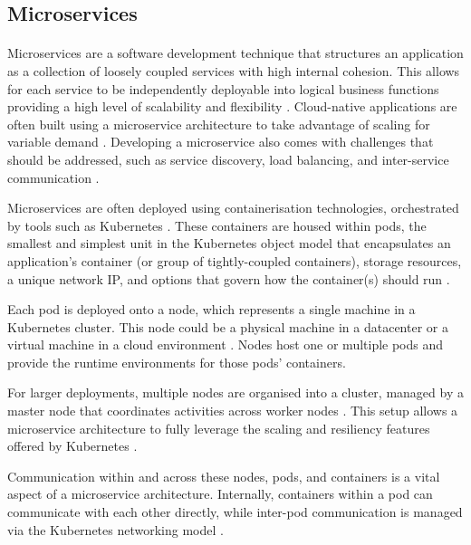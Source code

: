 \documentclass[12pt, conference, final, a4paper, onecolumn, compsoc]{IEEEtran}
\begin{document}
\subsection{Microservices} %
\paragraph{}

Microservices are a software development technique that structures an
application as a collection of loosely coupled services with high internal
cohesion. This allows for each service to be independently deployable into
logical business functions providing a high level of scalability and flexibility
\citep{microservice}. Cloud-native applications are often built using a
microservice architecture to take advantage of scaling for variable demand
\citep{microservice}. Developing a microservice also comes with
challenges that should be addressed, such as service discovery, load balancing,
and inter-service communication \citep{microservice}.

Microservices are often deployed using containerisation technologies,
orchestrated by tools such as Kubernetes \citep{kubernetes}. These containers
are housed within pods, the smallest and simplest unit in the Kubernetes object
model that encapsulates an application's container (or group of tightly-coupled
containers), storage resources, a unique network IP, and options that govern how
the container(s) should run \citep{k8s-struct}.

Each pod is deployed onto a node, which represents a single machine in a
Kubernetes cluster. This node could be a physical machine in a datacenter or a
virtual machine in a cloud environment \citep{k8s-struct}. Nodes host one
or multiple pods and provide the runtime environments for those pods'
containers.

For larger deployments, multiple nodes are organised into a cluster, managed by
a master node that coordinates activities across worker nodes
\citep{k8s-struct}. This setup allows a microservice architecture to
fully leverage the scaling and resiliency features offered by Kubernetes
\citep{kubernetes}.

Communication within and across these nodes, pods, and containers is a vital
aspect of a microservice architecture. Internally, containers within a pod can
communicate with each other directly, while inter-pod communication is managed
via the Kubernetes networking model \citep{k8s-network}.
\end{document}
